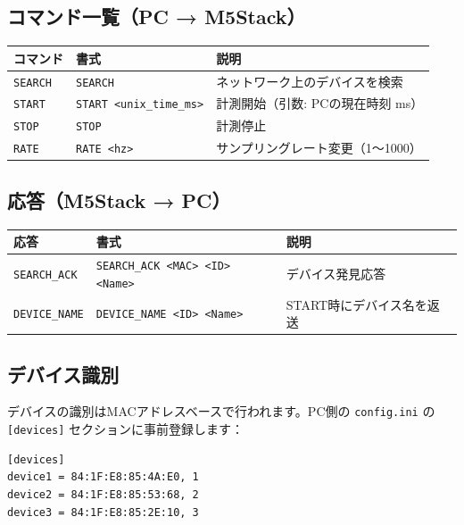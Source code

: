 \documentclass[a4paper,10pt]{ltjsarticle}
\begin{document}
\subsection{コマンド一覧（PC → M5Stack）}

\begin{table}[h]
\centering
\begin{tabular}{lll}
\toprule
\textbf{コマンド} & \textbf{書式} & \textbf{説明} \\
\midrule
\texttt{SEARCH} & \texttt{SEARCH} & ネットワーク上のデバイスを検索 \\
\texttt{START}  & \texttt{START <unix\_time\_ms>} & 計測開始（引数: PCの現在時刻 ms） \\
\texttt{STOP}   & \texttt{STOP} & 計測停止 \\
\texttt{RATE}   & \texttt{RATE <hz>} & サンプリングレート変更（1〜1000） \\
\bottomrule
\end{tabular}
\end{table}

\subsection{応答（M5Stack → PC）}

\begin{table}[h]
\centering
\begin{tabular}{lll}
\toprule
\textbf{応答} & \textbf{書式} & \textbf{説明} \\
\midrule
\texttt{SEARCH\_ACK}  & \texttt{SEARCH\_ACK <MAC> <ID> <Name>} & デバイス発見応答 \\
\texttt{DEVICE\_NAME} & \texttt{DEVICE\_NAME <ID> <Name>}       & START時にデバイス名を返送 \\
\bottomrule
\end{tabular}
\end{table}

\subsection{デバイス識別}

デバイスの識別はMACアドレスベースで行われます。PC側の \texttt{config.ini} の \texttt{[devices]} セクションに事前登録します：

\begin{lstlisting}
[devices]
device1 = 84:1F:E8:85:4A:E0, 1
device2 = 84:1F:E8:85:53:68, 2
device3 = 84:1F:E8:85:2E:10, 3
\end{lstlisting}
\end{document}
